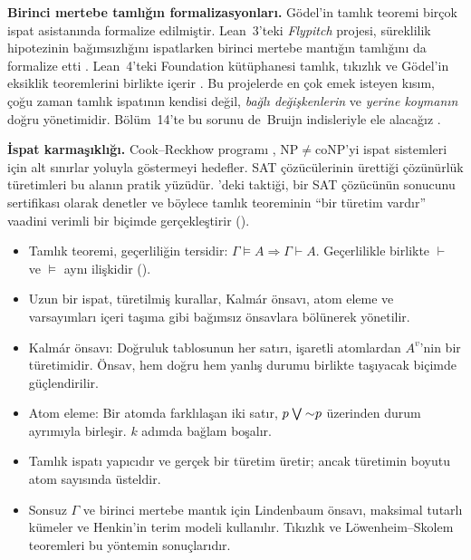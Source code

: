 \begin{arastirmanotu}
\textbf{Birinci mertebe tamlığın formalizasyonları.} Gödel'in tamlık
teoremi birçok ispat asistanında formalize edilmiştir. Lean~3'teki
\emph{Flypitch} projesi, süreklilik hipotezinin bağımsızlığını
ispatlarken birinci mertebe mantığın tamlığını da formalize etti
\citep{han2020flypitch}. Lean~4'teki Foundation kütüphanesi
\citep{foundation} tamlık, tıkızlık ve Gödel'in eksiklik teoremlerini
birlikte içerir \citep{saitou2026}. Bu projelerde en çok emek isteyen
kısım, çoğu zaman tamlık ispatının kendisi değil, \emph{bağlı
değişkenlerin} ve \emph{yerine koymanın} doğru yönetimidir. Bölüm~14'te
bu sorunu de~Bruijn indisleriyle ele alacağız \citep{debruijn1970}.

\textbf{İspat karmaşıklığı.} Cook--Reckhow programı \citep{cookreckhow1979},
$\mathrm{NP} \neq \mathrm{coNP}$'yi ispat sistemleri için alt sınırlar
yoluyla göstermeyi hedefler. SAT çözücülerinin ürettiği çözünürlük
türetimleri bu alanın pratik yüzüdür. \Lean{}'deki 
taktiği, bir SAT çözücünün sonucunu  sertifikası olarak
denetler ve böylece tamlık teoreminin ``bir türetim vardır'' vaadini
verimli bir biçimde gerçekleştirir ().
\end{arastirmanotu}

\begin{bolumozeti}
\begin{itemize}
  \item Tamlık teoremi, geçerliliğin tersidir: $\Gamma \models A
        \Rightarrow \Gamma \vdash A$. Geçerlilikle birlikte $\vdash$ ve
        $\models$ aynı ilişkidir ().
  \item Uzun bir ispat, türetilmiş kurallar, Kalmár önsavı, atom eleme
        ve varsayımları içeri taşıma gibi bağımsız önsavlara bölünerek
        yönetilir.
  \item Kalmár önsavı: Doğruluk tablosunun her satırı, işaretli
        atomlardan $A^v$'nin bir türetimidir. Önsav, hem doğru hem yanlış
        durumu birlikte taşıyacak biçimde güçlendirilir.
  \item Atom eleme: Bir atomda farklılaşan iki satır, $p \mathbin{\textstyle\bigvee} {\sim}p$
        üzerinden durum ayrımıyla birleşir. $k$ adımda bağlam boşalır.
  \item Tamlık ispatı yapıcıdır ve gerçek bir türetim üretir; ancak
        türetimin boyutu atom sayısında üsteldir.
  \item Sonsuz $\Gamma$ ve birinci mertebe mantık için Lindenbaum önsavı,
        maksimal tutarlı kümeler ve Henkin'in terim modeli kullanılır.
        Tıkızlık ve Löwenheim--Skolem teoremleri bu yöntemin
        sonuçlarıdır.
\end{itemize}
\end{bolumozeti}


